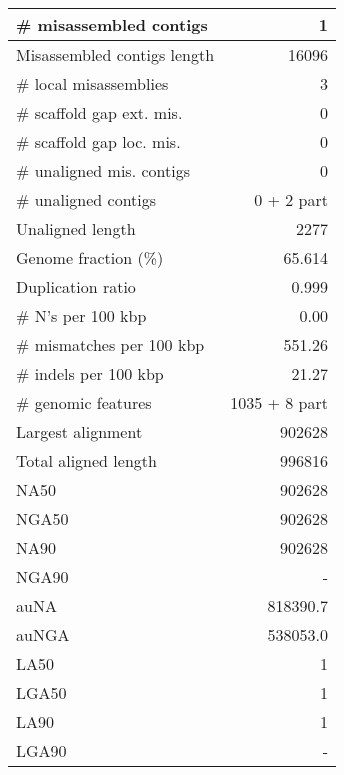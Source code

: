 \documentclass[12pt,a4paper]{article}
\begin{document}
\begin{table}[ht]
\begin{center}
\begin{tabular}{|l*{1}{|r}|}
\# misassembled contigs & 1 \\ \hline
Misassembled contigs length & 16096 \\ \hline
\# local misassemblies & 3 \\ \hline
\# scaffold gap ext. mis. & 0 \\ \hline
\# scaffold gap loc. mis. & 0 \\ \hline
\# unaligned mis. contigs & 0 \\ \hline
\# unaligned contigs & 0 + 2 part \\ \hline
Unaligned length & 2277 \\ \hline
Genome fraction (\%) & 65.614 \\ \hline
Duplication ratio & 0.999 \\ \hline
\# N's per 100 kbp & 0.00 \\ \hline
\# mismatches per 100 kbp & 551.26 \\ \hline
\# indels per 100 kbp & 21.27 \\ \hline
\# genomic features & 1035 + 8 part \\ \hline
Largest alignment & 902628 \\ \hline
Total aligned length & 996816 \\ \hline
NA50 & 902628 \\ \hline
NGA50 & 902628 \\ \hline
NA90 & 902628 \\ \hline
NGA90 & - \\ \hline
auNA & 818390.7 \\ \hline
auNGA & 538053.0 \\ \hline
LA50 & 1 \\ \hline
LGA50 & 1 \\ \hline
LA90 & 1 \\ \hline
LGA90 & - \\ \hline
\end{tabular}
\end{center}
\end{table}
\end{document}
